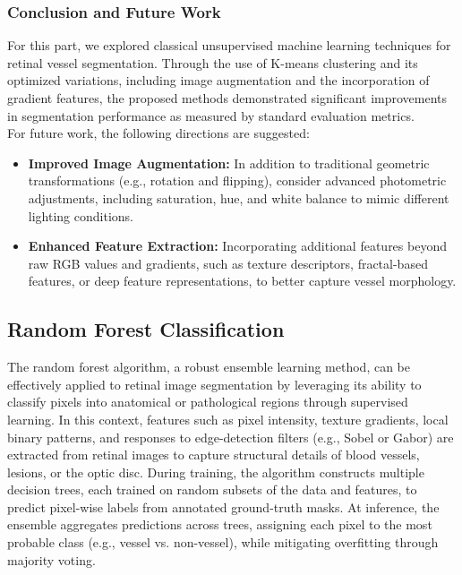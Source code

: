 \documentclass[12pt,letterpaper]{article}
\begin{document}
\subsubsection{Conclusion and Future Work}
For this part, we explored classical unsupervised machine learning techniques for retinal vessel segmentation. Through the use of K-means clustering and its optimized variations, including image augmentation and the incorporation of gradient features, the proposed methods demonstrated significant improvements in segmentation performance as measured by standard evaluation metrics. \\
For future work, the following directions are suggested:
\begin{itemize}
    \item \textbf{Improved Image Augmentation:} In addition to traditional geometric transformations (e.g., rotation and flipping), consider advanced photometric adjustments, including saturation, hue, and white balance to mimic different lighting conditions. 
    \item \textbf{Enhanced Feature Extraction:} Incorporating additional features beyond raw RGB values and gradients, such as texture descriptors, fractal-based features, or deep feature representations, to better capture vessel morphology.
\end{itemize}


\subsection{Random Forest Classification}
The random forest algorithm, a robust ensemble learning method, can be effectively applied to retinal image segmentation by leveraging its ability to classify pixels into anatomical or pathological regions through supervised learning. In this context, features such as pixel intensity, texture gradients, local binary patterns, and responses to edge-detection filters (e.g., Sobel or Gabor) are extracted from retinal images to capture structural details of blood vessels, lesions, or the optic disc. During training, the algorithm constructs multiple decision trees, each trained on random subsets of the data and features, to predict pixel-wise labels from annotated ground-truth masks. At inference, the ensemble aggregates predictions across trees, assigning each pixel to the most probable class (e.g., vessel vs. non-vessel), while mitigating overfitting through majority voting. 
\end{document}
